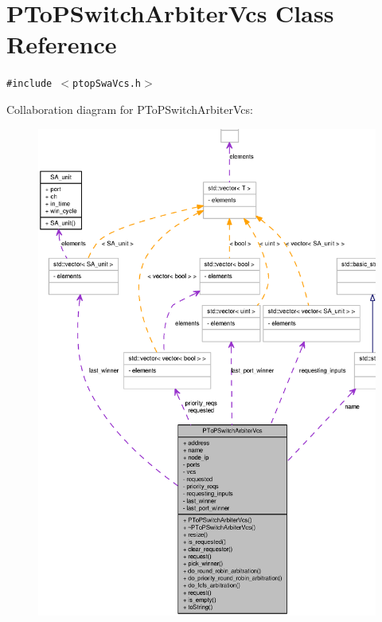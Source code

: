 \section{PToPSwitchArbiterVcs Class Reference}
\label{classPToPSwitchArbiterVcs}
{\tt \#include $<$ptopSwaVcs.h$>$}

Collaboration diagram for PToPSwitchArbiterVcs:\nopagebreak
\begin{figure}[H]
\begin{center}
\leavevmode
\includegraphics[width=400pt]{classPToPSwitchArbiterVcs__coll__graph}
\end{center}
\end{figure}
